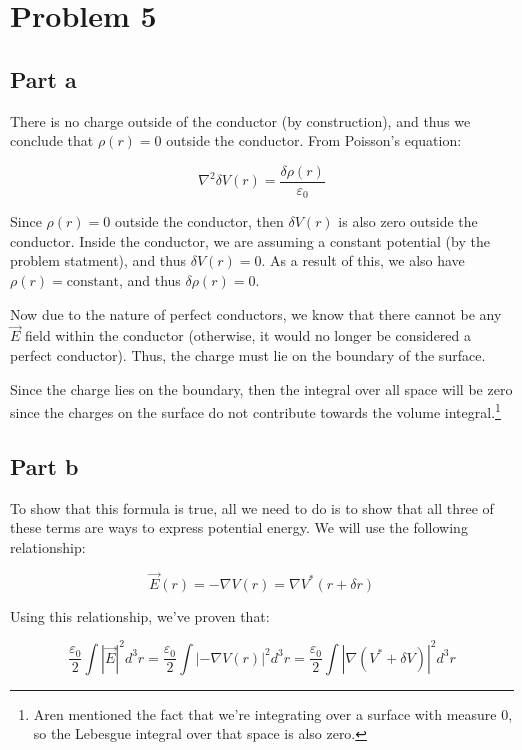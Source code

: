 \documentclass{article}
\theoremstyle{definition}
\numberwithin{equation}{section}
\numberwithin{definition}{section}
\begin{document}
    

    \section{Problem 5}

    \subsection{Part a}
    
    There is no charge outside of the conductor (by construction), and thus we conclude that $\rho(r) = 0$ outside the conductor. From Poisson's equation:

    \[ \nabla^2 \delta V(r) = \frac{\delta \rho(r)}{\varepsilon_0}\]

    Since $\rho(r) = 0$ outside the conductor, then $\delta V(r)$ is also zero outside the conductor. Inside the conductor, we are assuming a constant potential (by the problem statment), and thus $\delta V(r) = 0$. As a result of this, we also have $\rho(r) = \text{constant}$, and thus $\delta \rho(r) = 0$. 

    Now due to the nature of perfect conductors, we know that there cannot be any $\vec{E}$ field within the conductor (otherwise, it would no longer be considered a perfect conductor). Thus, the charge must lie on the boundary of the surface. 

    Since the charge lies on the boundary, then the integral over all space will be zero since the charges on the surface do not contribute towards the volume integral.\footnote{Aren mentioned the fact that we're integrating over a surface with measure 0, so the Lebesgue integral over that space is also zero.}

    \subsection{Part b}

    To show that this formula is true, all we need to do is to show that all three of these terms are ways to express potential energy. We will use the following relationship:

    \[ \vec{E}(r) = -\nabla V(r) = \nabla V^*(r + \delta r)\]

    Using this relationship, we've proven that:

    \[ \frac{\varepsilon_0}{2} \int |\vec{E}|^2 d^3 r= \frac{\varepsilon_0}{2} \int |-\nabla V(r)|^2 d^3r = \frac{\varepsilon_0}{2}\int|\nabla(V^* + \delta V)|^2 d^3 r\]
    
\end{document}
